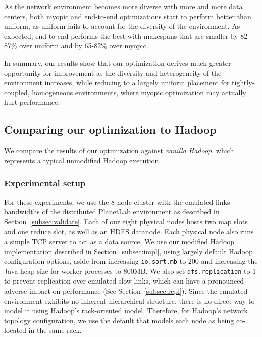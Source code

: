 As the network environment becomes more diverse with more and more data
centers, both myopic and end-to-end optimizations start to perform better than
uniform, as uniform fails to account for the diversity of the environment.
As expected, end-to-end performs the best with makespans that are smaller by
82-87\% over uniform and by 65-82\% over myopic.

In summary, our results show that our optimization derives much greater
opportunity for improvement as the diversity and heterogeneity of the
environment increases, while reducing to a largely uniform placement for
tightly-coupled, homogeneous environments, where myopic optimization may
actually hurt performance.

\subsection{Comparing our optimization to Hadoop}
\label{subsec:hadoop}

We compare the results of our optimization against \textit{vanilla Hadoop},
which represents a typical unmodified Hadoop execution.

\subsubsection{Experimental setup}
For these experiments, we use the 8-node cluster with the emulated links
bandwidths of the distributed PlanetLab environment as described in
Section~\ref{subsec:validate}.
Each of our eight physical nodes hosts two map slots and one reduce slot, as
well as an HDFS datanode.
Each physical node also runs a simple TCP server to act as a data source.
We use our modified Hadoop implementation described in
Section~\ref{subsec:impl}, using largely default Hadoop configuration options,
aside from increasing \verb=io.sort.mb= to 200 and increasing the Java heap
size for worker processes to 800\unit{MB}.
We also set \newline\verb=dfs.replication= to 1 to prevent replication over
emulated slow links, which can have a pronounced adverse impact on performance
(See Section~\ref{subsec:repl}).
Since the emulated environment exhibits no inherent hierarchical structure,
there is no direct way to model it using Hadoop's rack-oriented model.
Therefore, for Hadoop's network topology configuration, we use the default that
models each node as being co-located in the same rack.

